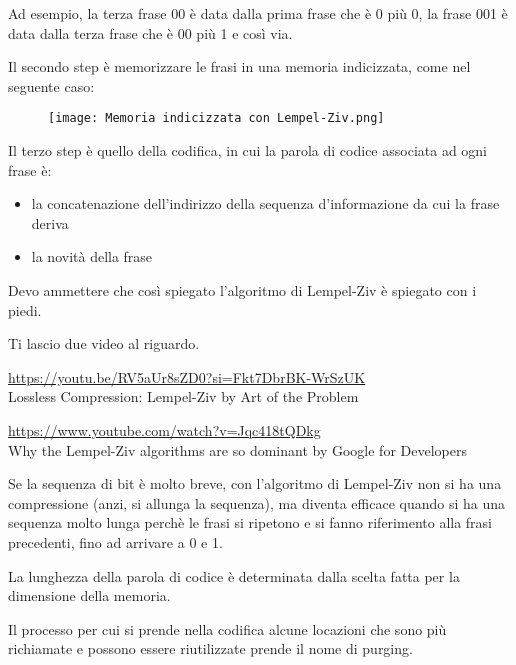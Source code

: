 Ad esempio, la terza frase 00 è data dalla prima frase che è 0 più 0, la frase 001 è data dalla terza frase che è 00 più 1 e così via. \newline 

Il secondo step è memorizzare le frasi in una memoria indicizzata, come nel seguente caso: 

\begin{figure}[h]
    \centering
    \texttt{[image: Memoria indicizzata con Lempel-Ziv.png]}
\end{figure} 

Il terzo step è quello della codifica, in cui la parola di codice associata ad ogni frase è: 

\begin{itemize}
    \item la concatenazione dell'indirizzo della sequenza d'informazione da cui la frase deriva 
    \item la novità della frase
\end{itemize}

\begin{tcolorbox}
    Devo ammettere che così spiegato l'algoritmo di Lempel-Ziv è spiegato con i piedi. \newline 

    Ti lascio due video al riguardo. \newline 

    \url{https://youtu.be/RV5aUr8sZD0?si=Fkt7DbrBK-WrSzUK}\\
    Lossless Compression: Lempel-Ziv by Art of the Problem \newline 

    \url{https://www.youtube.com/watch?v=Jqc418tQDkg}\\
    Why the Lempel-Ziv algorithms are so dominant by Google for Developers
\end{tcolorbox}

Se la sequenza di bit è molto breve, con l'algoritmo di Lempel-Ziv non si ha una compressione (anzi, si allunga la sequenza), 
ma diventa efficace quando si ha una sequenza molto lunga perchè le frasi si ripetono e si fanno riferimento alla frasi precedenti, fino ad arrivare a 0 e 1. \newline 

La lunghezza della parola di codice è determinata dalla scelta fatta per la dimensione della memoria. \newline 

Il processo per cui si prende nella codifica alcune locazioni che sono più richiamate e possono essere riutilizzate prende il nome di purging. \newline 

